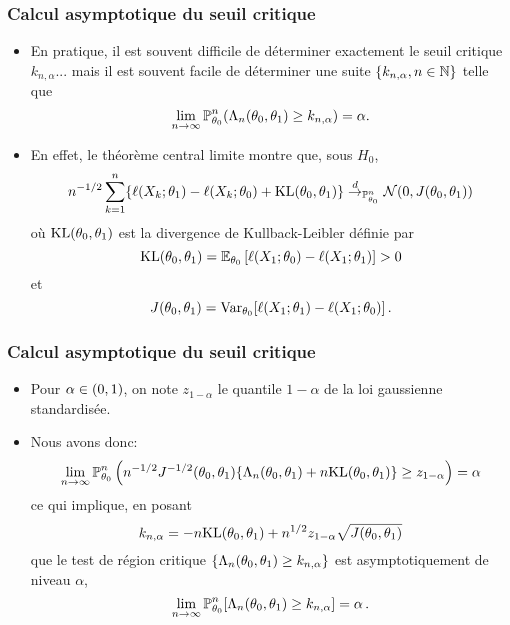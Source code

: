 \begin{frame}
\frametitle{Calcul asymptotique du seuil critique}
\begin{itemize}
\item En pratique, il est souvent difficile de déterminer exactement le seuil critique $k_{n,\alpha}$... mais il est souvent facile de déterminer
une suite $\{k_{n,\alpha}, n \in \mathbb{N}\}$ telle que
\[
\lim_{n \to \infty} \operatorname{{\mathbb P}}^n_{\theta_0} ( \Lambda_n(\theta_0,\theta_1) \geq  k_{n,\alpha}) = \alpha.
\]
\item En effet, le théorème central limite montre que, sous $H_0$,
\[
n^{-1/2} \sum_{k=1}^n \{ \ell(X_k; \theta_1) - \ell(X_k; \theta_0) + \mathrm{KL}(\theta_0,\theta_1) \} \stackrel{d}{\rightarrow}_{\operatorname{{\mathbb P}}^n_{\theta_0}} \mathcal{N}(0,J(\theta_0,\theta_1))
\]
où $\mathrm{KL}(\theta_0,\theta_1)$ est la \alert{divergence de Kullback-Leibler} définie par
\[
\mathrm{KL}(\theta_0,\theta_1) = \operatorname{{\mathbb E}}_{\theta_0}\left[ \ell(X_1;\theta_0) - \ell(X_1;\theta_1) \right] > 0
\]
et
\[
J(\theta_0,\theta_1)= \operatorname{\mathrm{Var}}_{\theta_0}[ \ell(X_1;\theta_1) - \ell(X_1;\theta_0) ] \,.
\]
\end{itemize}
\end{frame}

\begin{frame}
\frametitle{Calcul asymptotique du seuil critique}
\begin{itemize}
\item Pour $\alpha \in \left(0,1\right)$, on note $z_{1-\alpha}$ le quantile $1-\alpha$ de la loi gaussienne standardisée.
\item  Nous avons donc:
\[
\lim_{n \to \infty} \operatorname{{\mathbb P}}_{\theta_0}^n \left( n^{-1/2}
  J^{-1/2}(\theta_0,\theta_1) \{ \Lambda_n(\theta_0,\theta_1) +
  n \mathrm{KL}(\theta_0,\theta_1) \} \geq z_{1-\alpha} \right) = \alpha
\]
ce qui implique, en posant
\[
k_{n,\alpha}= -n \mathrm{KL}(\theta_0,\theta_1) + n^{1/2} z_{1-\alpha} \sqrt{J(\theta_0,\theta_1)}
\]
que le test de région critique $\{ \Lambda_n(\theta_0,\theta_1) \geq
k_{n,\alpha} \}$ est asymptotiquement de niveau $\alpha$,
\[
\lim_{n \to \infty} \operatorname{{\mathbb P}}^n_{\theta_0} [ \Lambda_n(\theta_0,\theta_1)
\geq k_{n,\alpha} ] = \alpha \,.
\]
\end{itemize}
\end{frame}

